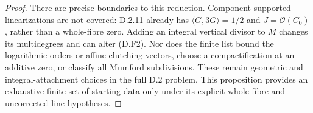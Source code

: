 \begin{proof}
There are precise boundaries to this reduction.
Component-supported linearizations are not covered:
D.2.11 already has $\langle G,3G\rangle=1/2$ and
$J=\mathcal O(C_0)$, rather than a whole-fibre zero.
Adding an integral vertical divisor to $M$ changes its
multidegrees and can alter (D.F2).
Nor does the finite list bound the logarithmic orders
or affine clutching vectors, choose a compactification
at an additive zero, or classify all Mumford subdivisions.
These remain geometric and integral-attachment choices
in the full D.2 problem. This proposition provides an
exhaustive finite set of starting data only under its
explicit whole-fibre and uncorrected-line hypotheses.
\end{proof}
